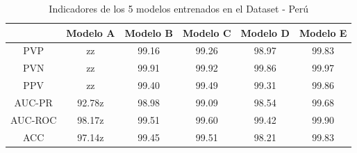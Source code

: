 		\begin{table}[H]
			\begin{center}
			\caption{\small{Indicadores de los 5 modelos entrenados en el Dataset - Perú}}
			\vspace{1.1em}
			\begin{tabular}{c|c|c|c|c|c|}
			\cline{2-6}
			                                 & Modelo A & Modelo B & Modelo C & Modelo D & Modelo E \\ \hline
			\multicolumn{1}{|c|}{PVP}        & zz         & 99.16       & 99.26       & 98.97       & 99.83       \\ \hline
			\multicolumn{1}{|c|}{PVN}        & zz         & 99.91       & 99.92       & 99.86       & 99.97       \\ \hline
			\multicolumn{1}{|c|}{PPV}        & zz         & 99.40       & 99.49       & 99.31       & 99.86       \\ \hline
			\multicolumn{1}{|c|}{AUC-PR}     & 92.78z     & 98.98       & 99.09       & 98.54       & 99.68       \\ \hline
			\multicolumn{1}{|c|}{AUC-ROC}    & 98.17z     & 99.51       & 99.60       & 99.42       & 99.90       \\ \hline
			\multicolumn{1}{|c|}{ACC}        & 97.14z     & 99.45       & 99.51       & 98.21       & 99.83       \\ \hline
			\end{tabular}
			\end{center}
		\end{table}

